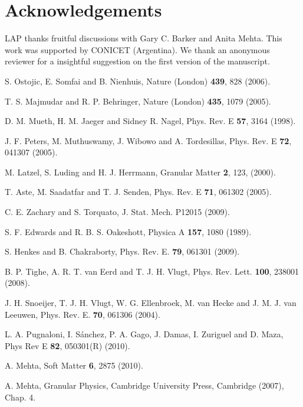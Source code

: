 \section*{Acknowledgements}

LAP thanks fruitful discussions with Gary C. Barker and Anita Mehta. This work was supported by CONICET (Argentina). We thank an anonymous reviewer for a insightful suggestion on the first version of the manuscript.

%
% 
% 
%
\begin{thebibliography}{50}

 S. Ostojic, E. Somfai and B. Nienhuis, Nature (London) \textbf{439}, 828 (2006).

 T. S. Majmudar and R. P. Behringer, Nature (London) \textbf{435}, 1079 (2005).

 D. M. Mueth, H. M. Jaeger and Sidney R. Nagel, Phys. Rev. E \textbf{57}, 3164 (1998).

 J. F. Peters, M. Muthuswamy, J. Wibowo and A. Tordesillas, Phys. Rev. E \textbf{72}, 041307 (2005).

 M. Latzel, S. Luding and H. J. Herrmann, Granular Matter \textbf{2}, 123, (2000).

 T. Aste, M. Saadatfar and T. J. Senden, Phys. Rev. E \textbf{71}, 061302 (2005).

 C. E. Zachary and S. Torquato, J. Stat. Mech. P12015 (2009).

 S. F. Edwards and R. B. S. Oakeshott, Physica A \textbf{157}, 1080 (1989).

 S. Henkes and B. Chakraborty, Phys. Rev. E. \textbf{79}, 061301 (2009).

 B. P. Tighe, A. R. T. van Eerd and T. J. H. Vlugt, Phys. Rev. Lett. \textbf{100}, 238001 (2008).

 J. H. Snoeijer, T. J. H. Vlugt, W. G. Ellenbroek, M. van Hecke and J. M. J. van Leeuwen, Phys. Rev. E. \textbf{70}, 061306 (2004).

 L. A. Pugnaloni, I. S\'anchez, P. A. Gago, J. Damas, I. Zuriguel and D. Maza, Phys Rev E \textbf{82}, 050301(R) (2010).

 A. Mehta, Soft Matter \textbf{6}, 2875 (2010).

 A. Mehta, Granular Physics, Cambridge University Press, Cambridge (2007), Chap. 4.


\end{thebibliography}
